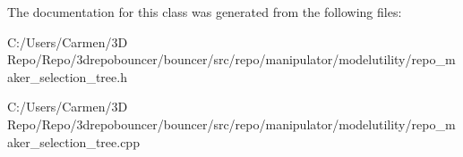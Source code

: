 The documentation for this class was generated from the following files\+:\begin{DoxyCompactItemize}
\item 
C\+:/\+Users/\+Carmen/3\+D Repo/\+Repo/3drepobouncer/bouncer/src/repo/manipulator/modelutility/repo\+\_\+maker\+\_\+selection\+\_\+tree.\+h\item 
C\+:/\+Users/\+Carmen/3\+D Repo/\+Repo/3drepobouncer/bouncer/src/repo/manipulator/modelutility/repo\+\_\+maker\+\_\+selection\+\_\+tree.\+cpp\end{DoxyCompactItemize}
